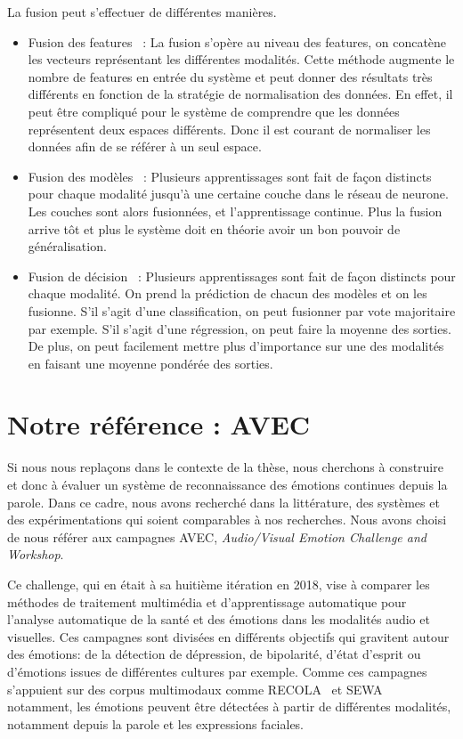 La fusion peut s'effectuer de différentes manières.
\begin{itemize}
  \item Fusion des features~\cite{Wollmer2013,Alam2014,Atrey2010} : La fusion s'opère au niveau des features, on concatène les vecteurs représentant les différentes modalités. Cette méthode augmente le nombre de features en entrée du système et peut donner des résultats très différents en fonction de la stratégie de normalisation des données. En effet, il peut être compliqué pour le système de comprendre que les données représentent deux espaces différents. Donc il est courant de normaliser les données afin de se référer à un seul espace.
  \item Fusion des modèles~\cite{Atrey2010,Liu2018} : Plusieurs apprentissages sont fait de façon distincts pour chaque modalité jusqu'à une certaine couche dans le réseau de neurone. Les couches sont alors fusionnées, et l'apprentissage continue. Plus la fusion arrive tôt et plus le système doit en théorie avoir un bon pouvoir de généralisation.
  \item Fusion de décision~\cite{Wollmer2013,Atrey2010} : Plusieurs apprentissages sont fait de façon distincts pour chaque modalité. On prend la prédiction de chacun des modèles et on les fusionne. S'il s'agit d'une classification, on peut fusionner par vote majoritaire par exemple. S'il s'agit d'une régression, on peut faire la moyenne des sorties. De plus, on peut facilement mettre plus d'importance sur une des modalités en faisant une moyenne pondérée des sorties.
\end{itemize}

\section{Notre référence : AVEC}


Si nous nous replaçons dans le contexte de la thèse, nous cherchons à construire et donc à évaluer un système de reconnaissance des émotions continues depuis la parole. Dans ce cadre, nous avons recherché dans la littérature, des systèmes et des expérimentations qui soient comparables à nos recherches. Nous avons choisi de nous référer aux campagnes AVEC, \textit{Audio/Visual Emotion Challenge and Workshop}.

Ce challenge, qui en était à sa huitième itération en 2018, vise à comparer les méthodes de traitement multimédia et d'apprentissage automatique pour l'analyse automatique de la santé et des émotions dans les modalités audio et visuelles. Ces campagnes sont divisées en différents objectifs qui gravitent autour des émotions: de la détection de dépression, de bipolarité, d'état d'esprit ou d'émotions issues de différentes cultures par exemple. Comme ces campagnes s'appuient sur des corpus multimodaux comme RECOLA~\cite{Ringeval2013} et SEWA~\cite{SEWA} notamment, les émotions peuvent être détectées à partir de différentes modalités, notamment depuis la parole et les expressions faciales.

